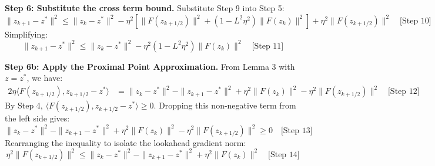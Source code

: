 \documentclass{article}
\begin{document}
\textbf{Step 6: Substitute the cross term bound.}
Substitute Step 9 into Step 5:
$$ \|z_{k+1} - z^*\|^2 \leq \|z_k - z^*\|^2 - \eta^2 \left[ \|F(z_{k+1/2})\|^2 + (1 - L^2 \eta^2) \|F(z_k)\|^2 \right] + \eta^2 \|F(z_{k+1/2})\|^2 \quad \text{[Step 10]} $$
Simplifying:
$$ \|z_{k+1} - z^*\|^2 \leq \|z_k - z^*\|^2 - \eta^2 (1 - L^2 \eta^2) \|F(z_k)\|^2 \quad \text{[Step 11]} $$

\textbf{Step 6b: Apply the Proximal Point Approximation.}
From Lemma 3 with $z = z^*$, we have:
\begin{align*}
2\eta \langle F(z_{k+1/2}), z_{k+1/2} - z^* \rangle &= \|z_k - z^*\|^2 - \|z_{k+1} - z^*\|^2 + \eta^2 \|F(z_k)\|^2 - \eta^2 \|F(z_{k+1/2})\|^2 \quad \text{[Step 12]}
\end{align*}
By Step 4, $\langle F(z_{k+1/2}), z_{k+1/2} - z^* \rangle \geq 0$. Dropping this non-negative term from the left side gives:
$$ \|z_k - z^*\|^2 - \|z_{k+1} - z^*\|^2 + \eta^2 \|F(z_k)\|^2 - \eta^2 \|F(z_{k+1/2})\|^2 \geq 0 \quad \text{[Step 13]} $$
Rearranging the inequality to isolate the lookahead gradient norm:
$$ \eta^2 \|F(z_{k+1/2})\|^2 \leq \|z_k - z^*\|^2 - \|z_{k+1} - z^*\|^2 + \eta^2 \|F(z_k)\|^2 \quad \text{[Step 14]} $$
\end{document}
